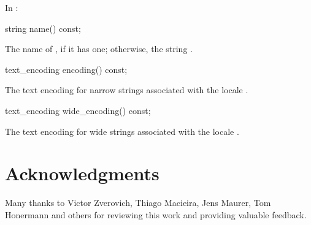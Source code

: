 \documentclass{wg21}
\begin{document}
In :

\begin{itemdecl}
string name() const;
\end{itemdecl}

\begin{itemdescr}
\pnum
\returns
The name of
,
if it has one; otherwise, the string .
\end{itemdescr}

\begin{addedblock}
\begin{itemdecl}
text_encoding encoding() const;
\end{itemdecl}

\begin{itemdescr}
  \returns The text encoding for narrow strings associated with the locale
  .
\end{itemdescr}

\begin{itemdecl}
text_encoding wide_encoding() const;
\end{itemdecl}

\begin{itemdescr}
  \returns The text encoding for wide strings associated with the locale
  .
\end{itemdescr}
\end{addedblock}

\section{Acknowledgments}

Many thanks to Victor Zverovich, Thiago Macieira, Jens Maurer, Tom Honermann and others for reviewing this work and providing valuable feedback.
\end{document}
